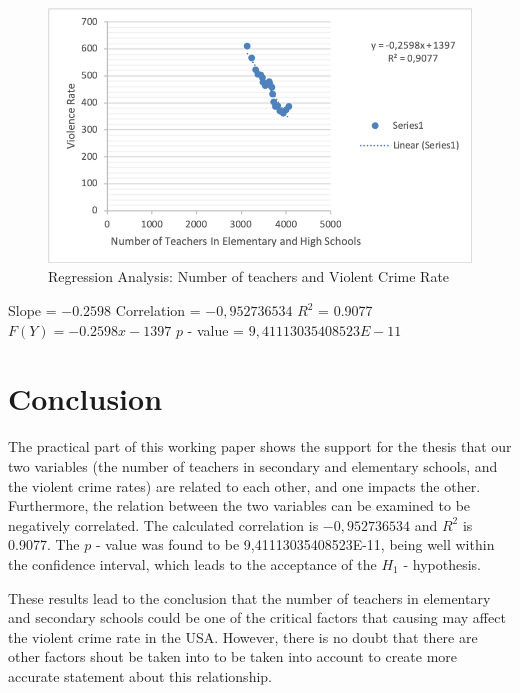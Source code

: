 \documentclass[thesis=B,english]{FITthesis}[2012/10/20]
\begin{document}
\begin{figure}[H]
	\label{fig:graph}
	\includegraphics{graph}
	\caption{Regression Analysis: Number  of teachers and Violent Crime Rate}
\end{figure}


\noindent Slope = $-0.2598$ \newline \newline
Correlation = $-0,952736534$ \newline \newline
$R^2$ = 0.9077 \newline \newline
$F(Y) =-0.2598x - 1397$ \newline \newline
$p$ - value = $9,41113035408523E-11$


\chapter{Conclusion}

The practical part of this working paper shows the support for the thesis that our two variables (the number of teachers in secondary and elementary schools, and the violent crime rates) are related to each other, and one impacts the other. Furthermore, the relation between the two variables can be examined to be negatively correlated. The calculated correlation is  $-0,952736534$  and $R^2$ is  0.9077. The $p$ - value was found to be 9,41113035408523E-11, being well within the confidence interval, which leads
to the acceptance of the $H_1$ - hypothesis. 


These results lead to the conclusion that the number of teachers in elementary and secondary schools could be one of the critical factors that causing  may affect the violent crime rate in the USA. However, there is no doubt that there are other factors shout be taken into to be taken into account to create more accurate statement about this relationship. 
\end{document}

